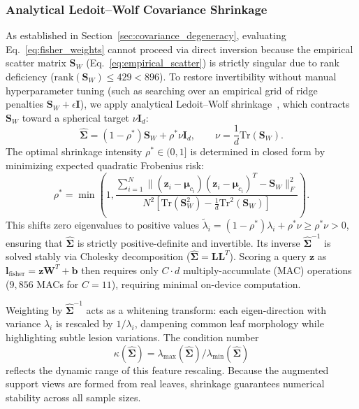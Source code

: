 \subsubsection{Analytical Ledoit--Wolf Covariance Shrinkage}
\label{sec:shrinkage}
As established in Section~\ref{sec:covariance_degeneracy}, evaluating Eq.~\eqref{eq:fisher_weights} cannot proceed via direct inversion because the empirical scatter matrix $\mathbf{S}_W$ (Eq.~\eqref{eq:empirical_scatter}) is strictly singular due to rank deficiency ($\text{rank}(\mathbf{S}_W) \le 429 < 896$). To restore invertibility without manual hyperparameter tuning (such as searching over an empirical grid of ridge penalties $\mathbf{S}_W + \epsilon \mathbf{I}$), we apply analytical Ledoit--Wolf shrinkage~\cite{ledoit2004well}, which contracts $\mathbf{S}_W$ toward a spherical target $\nu \mathbf{I}_d$:
\begin{equation}
    \hat{\mathbf{\Sigma}} = (1 - \rho^*)\mathbf{S}_W + \rho^* \nu \mathbf{I}_d, \qquad \nu = \frac{1}{d}\text{Tr}(\mathbf{S}_W).
    \label{eq:lw_target}
\end{equation}
The optimal shrinkage intensity $\rho^* \in (0, 1]$ is determined in closed form by minimizing expected quadratic Frobenius risk:
\begin{equation}
    \rho^* = \min\left(1, \frac{\sum_{i=1}^N \|(\mathbf{z}_i - \boldsymbol{\mu}_{c_i})(\mathbf{z}_i - \boldsymbol{\mu}_{c_i})^T - \mathbf{S}_W\|_F^2}{N^2 \left[\text{Tr}(\mathbf{S}_W^2) - \frac{1}{d}\text{Tr}^2(\mathbf{S}_W)\right]}\right).
    \label{eq:lw_shrinkage}
\end{equation}
This shifts zero eigenvalues to positive values $\tilde{\lambda}_i = (1 - \rho^*)\lambda_i + \rho^* \nu \ge \rho^* \nu > 0$, ensuring that $\hat{\mathbf{\Sigma}}$ is strictly positive-definite and invertible. Its inverse $\hat{\mathbf{\Sigma}}^{-1}$ is solved stably via Cholesky decomposition ($\hat{\mathbf{\Sigma}} = \mathbf{L}\mathbf{L}^T$). Scoring a query $\mathbf{z}$ as $\mathbf{l}_{\text{fisher}} = \mathbf{z}\mathbf{W}^T + \mathbf{b}$ then requires only $C \cdot d$ multiply-accumulate (MAC) operations ($9{,}856$ MACs for $C=11$), requiring minimal on-device computation.

Weighting by $\hat{\mathbf{\Sigma}}^{-1}$ acts as a whitening transform: each eigen-direction with variance $\lambda_i$ is rescaled by $1/\lambda_i$, dampening common leaf morphology while highlighting subtle lesion variations. The condition number
\begin{equation}
    \kappa(\hat{\mathbf{\Sigma}}) = \lambda_{\max}(\hat{\mathbf{\Sigma}}) / \lambda_{\min}(\hat{\mathbf{\Sigma}})
    \label{eq:whitening_spread}
\end{equation}
reflects the dynamic range of this feature rescaling. Because the augmented support views are formed from real leaves, shrinkage guarantees numerical stability across all sample sizes.

